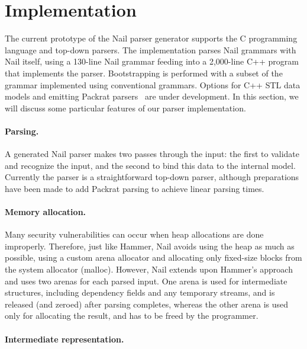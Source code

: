 \section{Implementation}
\label{s:impl}

The current prototype of the Nail parser generator supports the C programming
language and top-down parsers. The implementation parses Nail grammars with Nail itself, using a
130-line Nail grammar feeding into a 2,000-line C++ program that
implements the parser. Bootstrapping is
performed with a subset of the grammar implemented using conventional grammars. 
Options for C++ STL data models and emitting
Packrat parsers~\cite{packrat-parsing:icfp02} are under development. In
this section, we will discuss some particular features of our parser
implementation.



\paragraph{Parsing.}

A generated Nail parser makes two passes through the input: the first to
validate and recognize the input, and the second to bind this data to the internal
model. Currently the parser is a straightforward top-down parser, although
preparations have been made to add Packrat parsing to achieve linear parsing
times.

\paragraph{Memory allocation.}

Many security vulnerabilities can occur when heap allocations are done improperly. Therefore, just
like Hammer, Nail avoids using the heap as much as possible, using a custom arena allocator and
allocating only fixed-size blocks from the system allocator (malloc). However, Nail extends upon
Hammer's approach and uses two arenas for each parsed input. One arena is used for intermediate
structures, including dependency fields and any temporary streams, and is released (and zeroed)
after parsing completes, whereas the other arena is used only for allocating the result, and has to
be freed by the programmer.

\paragraph{Intermediate representation.}

